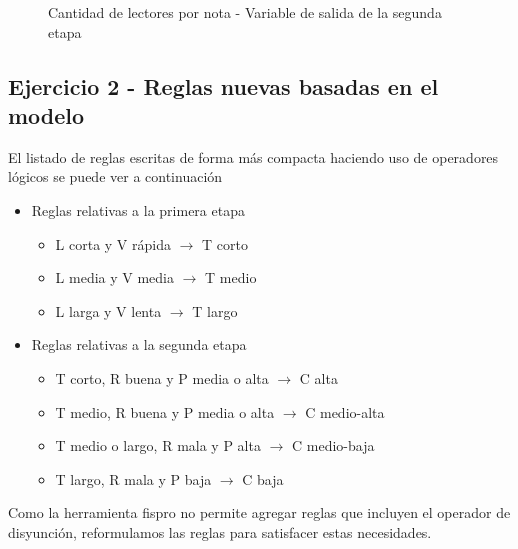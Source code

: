 \documentclass{article}
\begin{document}
\begin{itemize}
\begin{figure}[H]
	\centering
	\caption{Cantidad de lectores por nota - Variable de salida de la segunda etapa}
	\label{fig:etapa2-salida}
\end{figure}

\pagebreak
\subsection*{Ejercicio 2 - Reglas nuevas basadas en el modelo}
El listado de reglas escritas de forma más compacta haciendo uso de operadores lógicos se puede ver a continuación

\begin{itemize}
	\item Reglas relativas a la primera etapa
	\begin{itemize}
		\item L corta y V rápida $\rightarrow$ T corto
		\item L media y V media $\rightarrow$ T medio
		\item L larga y V lenta $\rightarrow$ T largo
	\end{itemize}
	\item Reglas relativas a la segunda etapa
	\begin{itemize}
		\item T corto, R buena y P media o alta $\rightarrow$ C alta
		\item T medio, R buena y P media o alta $\rightarrow$ C medio-alta
		\item T medio o largo, R mala y P alta $\rightarrow$ C medio-baja
		\item T largo, R mala y P baja $\rightarrow$ C baja
	\end{itemize}
\end{itemize}

Como la herramienta fispro no permite agregar reglas que incluyen el operador de disyunción, reformulamos las reglas para satisfacer estas necesidades.


\end{itemize}
\end{document}
